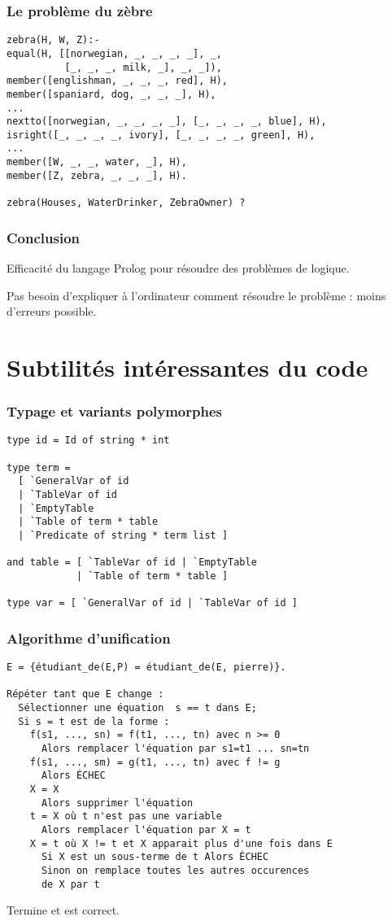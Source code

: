 \documentclass[aspectratio=43]{beamer}
\begin{document}
\begin{frame}[fragile]
  \frametitle{Le problème du zèbre}
  \begin{verbatim}
zebra(H, W, Z):-
equal(H, [[norwegian, _, _, _, _], _,
          [_, _, _, milk, _], _, _]),
member([englishman, _, _, _, red], H),
member([spaniard, dog, _, _, _], H),
...
nextto([norwegian, _, _, _, _], [_, _, _, _, blue], H),
isright([_, _, _, _, ivory], [_, _, _, _, green], H),
...
member([W, _, _, water, _], H),
member([Z, zebra, _, _, _], H).

zebra(Houses, WaterDrinker, ZebraOwner) ?
  \end{verbatim}
\end{frame}

\begin{frame}[plain]
  \frametitle{Conclusion}
  Efficacité du langage Prolog pour résoudre des problèmes de logique.

  \vspace{1em}
  Pas besoin d'expliquer à l'ordinateur comment résoudre le problème : moins d'erreurs possible.
\end{frame}

\section{Subtilités intéressantes du code}

\begin{frame}[fragile]
  \frametitle{Typage et variants polymorphes}
  \begin{verbatim}
type id = Id of string * int

type term =
  [ `GeneralVar of id
  | `TableVar of id
  | `EmptyTable
  | `Table of term * table
  | `Predicate of string * term list ]

and table = [ `TableVar of id | `EmptyTable
            | `Table of term * table ]

type var = [ `GeneralVar of id | `TableVar of id ]
  \end{verbatim}
\end{frame}

\begin{frame}[fragile]
  \frametitle{Algorithme d'unification}
  \begin{verbatim}
E = {étudiant_de(E,P) = étudiant_de(E, pierre)}.

Répéter tant que E change :
  Sélectionner une équation  s == t dans E;
  Si s = t est de la forme :
    f(s1, ..., sn) = f(t1, ..., tn) avec n >= 0
      Alors remplacer l'équation par s1=t1 ... sn=tn
    f(s1, ..., sm) = g(t1, ..., tn) avec f != g
      Alors ÉCHEC
    X = X
      Alors supprimer l'équation
    t = X où t n'est pas une variable
      Alors remplacer l'équation par X = t
    X = t où X != t et X apparait plus d'une fois dans E
      Si X est un sous-terme de t Alors ÉCHEC
      Sinon on remplace toutes les autres occurences
      de X par t
  \end{verbatim}

  \vspace{1em}
  Termine et est correct.
\end{frame}
\end{document}
